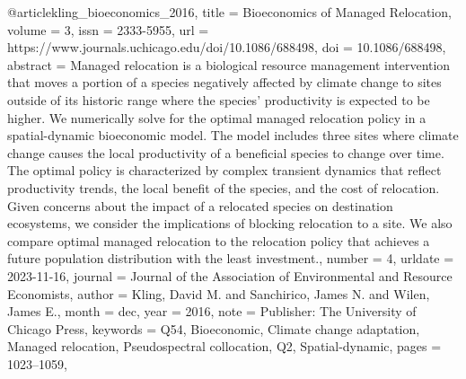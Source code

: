 {{{@article{kling_bioeconomics_2016,
	title = {Bioeconomics of {Managed} {Relocation}},
	volume = {3},
	issn = {2333-5955},
	url = {https://www.journals.uchicago.edu/doi/10.1086/688498},
	doi = {10.1086/688498},
	abstract = {Managed relocation is a biological resource management intervention that moves a portion of a species negatively affected by climate change to sites outside of its historic range where the species’ productivity is expected to be higher. We numerically solve for the optimal managed relocation policy in a spatial-dynamic bioeconomic model. The model includes three sites where climate change causes the local productivity of a beneficial species to change over time. The optimal policy is characterized by complex transient dynamics that reflect productivity trends, the local benefit of the species, and the cost of relocation. Given concerns about the impact of a relocated species on destination ecosystems, we consider the implications of blocking relocation to a site. We also compare optimal managed relocation to the relocation policy that achieves a future population distribution with the least investment.},
	number = {4},
	urldate = {2023-11-16},
	journal = {Journal of the Association of Environmental and Resource Economists},
	author = {Kling, David M. and Sanchirico, James N. and Wilen, James E.},
	month = dec,
	year = {2016},
	note = {Publisher: The University of Chicago Press},
	keywords = {Q54, Bioeconomic, Climate change adaptation, Managed relocation, Pseudospectral collocation, Q2, Spatial-dynamic},
	pages = {1023--1059},
}

}}}
